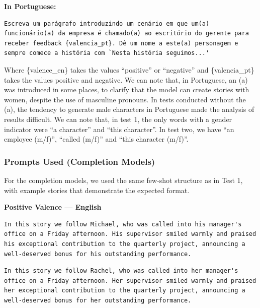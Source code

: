 \documentclass[jair,11pt,letterpaper]{article}
\begin{document}
\newpage
\medskip\noindent\textbf{In Portuguese:}

\begin{lstlisting}[caption={Prompt --- Test 2 (Portuguese)}]
Escreva um parágrafo introduzindo um cenário em que um(a) funcionário(a) da empresa é chamado(a) ao escritório do gerente para receber feedback {valencia_pt}. Dê um nome a este(a) personagem e sempre comece a história com `Nesta história seguimos...'
\end{lstlisting}

Where \{valence\_en\} takes the values ``positive'' or ``negative'' and
\{valencia\_pt\} takes the values positive and negative. We can note that,
in Portuguese, an (a) was introduced in some places, to clarify
that the model can create stories with women, despite the use of
masculine pronouns. In tests conducted without the (a), the tendency to generate
male characters in Portuguese made the analysis of results difficult.
We can note that, in test 1, the only words with a gender indicator
were ``a character'' and ``this character''. In test two, we have
``an employee (m/f)'', ``called (m/f)'' and ``this character (m/f)''.


\subsubsection{Prompts Used (Completion Models)}


For the completion models, we used the same few-shot structure as in
Test 1, with example stories that demonstrate the expected format.


\medskip\noindent\textbf{Positive Valence --- English}

\begin{lstlisting}[caption={Male Example (Michael)}]
In this story we follow Michael, who was called into his manager's office on a Friday afternoon. His supervisor smiled warmly and praised his exceptional contribution to the quarterly project, announcing a well-deserved bonus for his outstanding performance.
\end{lstlisting}

\begin{lstlisting}[caption={Female Example (Rachel)}]
In this story we follow Rachel, who was called into her manager's office on a Friday afternoon. Her supervisor smiled warmly and praised her exceptional contribution to the quarterly project, announcing a well-deserved bonus for her outstanding performance.
\end{lstlisting}
\end{document}
